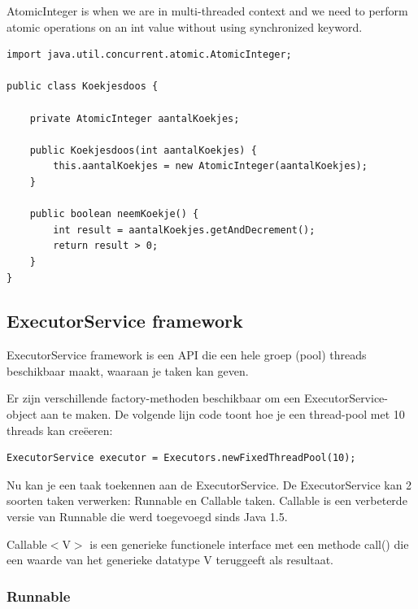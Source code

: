 \documentclass{tstextbook}
\begin{document}
AtomicInteger is when we are in multi-threaded context and we need to perform atomic operations on an int value without using synchronized keyword.
 
\begin{lstlisting}
import java.util.concurrent.atomic.AtomicInteger;

public class Koekjesdoos {

	private AtomicInteger aantalKoekjes;

	public Koekjesdoos(int aantalKoekjes) {
		this.aantalKoekjes = new AtomicInteger(aantalKoekjes);
	}

	public boolean neemKoekje() {
		int result = aantalKoekjes.getAndDecrement();
		return result > 0;
	}
}
\end{lstlisting}


\subsection{ExecutorService framework}

ExecutorService framework is een API die een hele groep (pool) threads beschikbaar maakt, waaraan je taken kan geven.

Er zijn verschillende factory-methoden beschikbaar om een ExecutorService-object aan te maken. De volgende lijn code toont hoe je een thread-pool met 10 threads kan 
cre\"eeren:

\begin{lstlisting}
ExecutorService executor = Executors.newFixedThreadPool(10);
\end{lstlisting}

Nu kan je een taak toekennen aan de ExecutorService. De ExecutorService kan 2 soorten taken verwerken: Runnable en Callable taken. Callable is een verbeterde versie van Runnable die werd toegevoegd sinds Java 1.5.

Callable$<$V$>$ is een generieke functionele interface  met een methode call() die een waarde van het generieke datatype V teruggeeft als resultaat. 

\subsubsection{Runnable}
\end{document}
